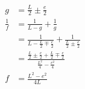 \documentclass[ex]{exercise}
\begin{document}
\begin{align*}
    g &= \frac{L}{2} \pm \frac e2\\
    \frac{1}{f} &= \frac{1}{L-g} + \frac{1}{g} \\
    &= \frac{1}{L-\frac{L}{2} \mp \frac e2} + \frac{1}{\frac{L}{2} \pm \frac e2} \\
    &= \frac{\frac L2  \pm \frac e2 + \frac L2 \mp \frac e2}{\frac{L^2}{4} - \frac {e^2}{4}} \\
    f &= \frac{L^2 - e^2}{4L}
\end{align*}


\end{document}

